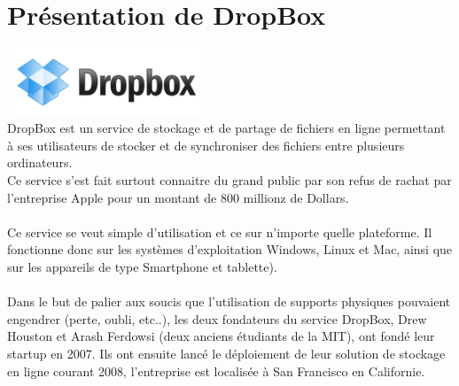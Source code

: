 \documentclass[a4paper, 10pt]{article}
\begin{document}
\section*{Pr\'esentation de DropBox}
\includegraphics[height = 2cm, width = 6cm]{dropbox_logo.png}\\
DropBox est un service de stockage et de partage de fichiers en ligne permettant \`a ses utilisateurs de stocker et
de synchroniser des fichiers entre plusieurs ordinateurs.\\
Ce service s'est fait surtout connaitre du grand public par son refus de rachat
par l'entreprise Apple pour un montant de 800 millionz de Dollars.\\ \\
Ce service se veut simple d'utilisation et ce sur n'importe quelle plateforme.
Il fonctionne donc sur les syst\`emes d'exploitation Windows, Linux et Mac, ainsi que sur les appareils de type Smartphone et tablette).\\ \\
Dans le but de palier aux soucis que l'utilisation de supports physiques pouvaient engendrer (perte, oubli, etc..),
les deux fondateurs du service DropBox, Drew Houston et Arash Ferdowsi (deux anciens \'etudiants de la MIT), ont fond\'e leur startup en 2007.
Ils ont ensuite lanc\'e le d\'eploiement de leur solution de stockage en ligne courant 2008,
l'entreprise est localis\'ee \`a San Francisco en Californie.
\end{document}
